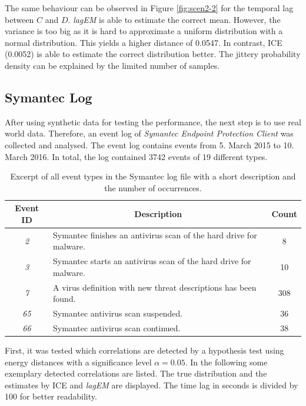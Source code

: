 \documentclass[conference]{IEEEtran}
\theoremstyle{examplestyle}
\begin{document}
The same behaviour can be observed in Figure \ref{fig:scen2-2} for the temporal lag between \(C\) and \(D\). \textit{lagEM} is able to estimate the correct mean. However, the variance is too big as it is hard to approximate a uniform distribution with a normal distribution. This yields a higher distance of 0.0547. In contrast, \ac{ICE} (0.0052) is able to estimate the correct distribution better. The jittery probability density can be explained by the limited number of samples.












\subsection{Symantec Log}
\label{sec:symantecLog}

After using synthetic data for testing the performance, the next step is to use real world data. Therefore, an event log of \textit{Symantec Endpoint Protection Client} was collected and analysed. The event log contains events from 5. March 2015 to 10. March 2016. In total, the log contained 3742 events of 19 different types.

\begin{table}[!ht]
	\centering
	\begin{tabular}{c p{} c}
		\textbf{Event ID} & \multicolumn{1}{c}{\textbf{Description}} & \textbf{Count} \\
		\hline
		\textit{2}	& Symantec finishes an antivirus scan of the hard drive for malware. & 8 \\
		\textit{3}	& Symantec starts an antivirus scan of the hard drive for malware. & 10 \\
		\textit{7}	& A virus definition with new threat descriptions has been found. & 308 \\
		\textit{65}	& Symantec antivirus scan suspended. & 36 \\
		\textit{66}	& Symantec antivirus scan continued. & 38 \\
	\end{tabular}
	\caption{Excerpt of all event types in the Symantec log file with a short description and the number of occurrences.}
	\label{tbl:symantecEvents}
\end{table}


First, it was tested which correlations are detected by a hypothesis test using energy distances with a significance level \(\alpha = 0.05\). In the following some exemplary detected correlations are listed. The true distribution and the estimates by \ac{ICE} and \textit{lagEM} are displayed. The time lag in seconds is divided by 100 for better readability.
\end{document}
